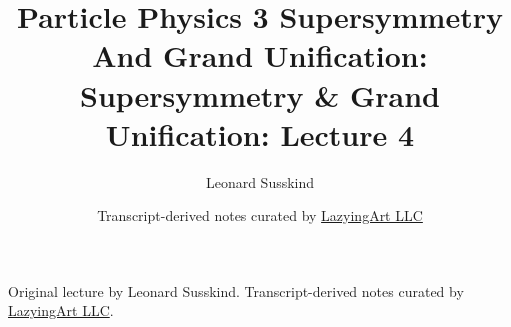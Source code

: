 \documentclass[11pt,oneside]{book}
\begin{document}
\frontmatter
\title{Particle Physics 3 Supersymmetry And Grand Unification: Supersymmetry \& Grand Unification: Lecture 4}
\author{Leonard Susskind}
\date{Transcript-derived notes curated by \href{https://lazying.art}{LazyingArt LLC}}
\maketitle
\begin{center}
\small Original lecture by Leonard Susskind. Transcript-derived notes curated by \href{https://lazying.art}{LazyingArt LLC}.
\end{center}
\clearpage
\mainmatter

\end{document}
